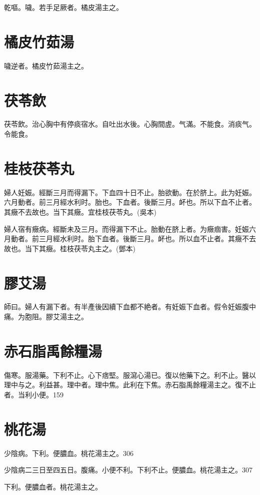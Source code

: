 \documentclass[b5paper,twoside,zihao=-4,UTF8]{ctexbook}
\begin{document}
乾嘔。噦。若手足厥者。橘皮湯主之。

\section{橘皮竹茹湯}

噦逆者。橘皮竹茹湯主之。

\section{茯苓飲}

茯苓飲。治心胸中有停痰宿水。自吐出水後。心胸間虗。气滿。不能食。消痰气。令能食。

\section{桂枝茯苓丸}

婦人妊娠。經斷三月而得漏下。下血四十日不止。胎欲動。在於脐上。此为妊娠。六月動者。前三月經水利时。胎也。下血者。後斷三月。衃也。所以下血不止者。其癥不去故也。当下其癥。宜桂枝茯苓丸。(吳本)

婦人宿有癥病。經斷未及三月。而得漏下不止。胎動在脐上者。为癥痼害。妊娠六月動者。前三月經水利时。胎下血者。後斷三月。衃也。所以血不止者。其癥不去故也。当下其癥。桂枝茯苓丸主之。(鄧本)

\section{膠艾湯}

師曰。婦人有漏下者。有半產後因續下血都不絶者。有妊娠下血者。假令妊娠腹中痛。为胞阻。膠艾湯主之。

\section{赤石脂禹餘糧湯}

傷寒。服湯藥。下利不止。心下痞堅。服瀉心湯已。復以他藥下之。利不止。醫以理中与之。利益甚。理中者。理中焦。此利在下焦。赤石脂禹餘糧湯主之。復不止者。当利小便。159

\section{桃花湯}

少陰病。下利。便膿血。桃花湯主之。306

少陰病二三日至四五日。腹痛。小便不利。下利不止。便膿血。桃花湯主之。307

下利。便膿血者。桃花湯主之。
\end{document}
